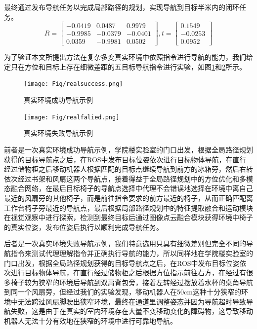 最终通过发布导航任务以完成局部路径的规划，实现导航到目标半米内的闭环任务。
\begin{equation}
    R = \left[ {\begin{array}{*{20}{c}}
{ - 0.0419}&{0.0487}&{0.9979}\\
{ - 0.9985}&{ - 0.0379}&{ - 0.0401}\\
{0.0359}&{ - 0.9981}&{0.0502}
\end{array}} \right],t = \left[ {\begin{array}{*{20}{c}}
{0.1549}\\
{ - 0.0253}\\
{0.0952}
\end{array}} \right]
    \label{myeqcor}
\end{equation}




为了验证本文所提出方法在复杂多变真实环境中依照指令进行导航的能力，我们给定只在方位和目标上存在细微差距的五目标导航指令进行实验，如图\ref{realenvsuccess}和\ref{realenvfalied}所示。
\begin{figure}[htbp]
    \centering
    \texttt{[image: Fig/realsuccess.png]}
    \caption{\label{realenvsuccess}真实环境成功导航示例}
\end{figure}

\begin{figure}[htbp]
    \centering
    \texttt{[image: Fig/realfalied.png]}
    \caption{\label{realenvfalied}真实环境失败导航示例}
\end{figure}

前者是一次真实环境成功导航示例，学院楼实验室的门口出发，根据全局路径规划获得的目标导航点之后，在ROS中发布目标位姿依次进行目标物体导航，在直行经过储物柜之后移动机器人根据匹配的目标点继续导航到前方的冰箱旁，然后右转依次经过书架和风扇这两个导航点，接着得益于全局路径规划中的方位优化和多模态融合网络，在最后目标椅子的导航点选择中代理不会错误地选择在环境中离自己最近的风扇旁的其他椅子，而是前往指令要求的前方最近的椅子，从而正确匹配离工作台椅子旁最近的导航点，最后根据局部路径规划中的特征提取融合和运动模块在视觉观察中进行探索，检测到最终目标后通过图像点云融合模块获得环境中椅子的真实位姿，发布位姿后执行以顺利完成导航任务。

后者是一次真实环境失败导航示例，我们特意选用只具有细微差别但完全不同的导航指令来测试代理理解指令并正确执行导航的能力，所以同样地在学院楼实验室的门口出发，根据全局路径规划获得的目标导航点之后，在ROS中发布目标位姿依次进行目标物体导航，在直行经过储物柜之后根据方位指示前往右方，在经过有很多椅子较为狭窄的环境后导航到双肩背包旁，接着左转经过摆放着水杯的桌角导航到同一个风扇旁，但经过我们的实验发现，移动机器人在50cm这种十分狭窄的环境中无法跨过风扇脚驶出狭窄环境，最终在通道里调整姿态并因为导航超时导致导航失败，这是由于在真实的室内环境存在大量不变移动变化的障碍物，这导致移动机器人无法十分有效地在狭窄的环境中进行可靠地导航。



